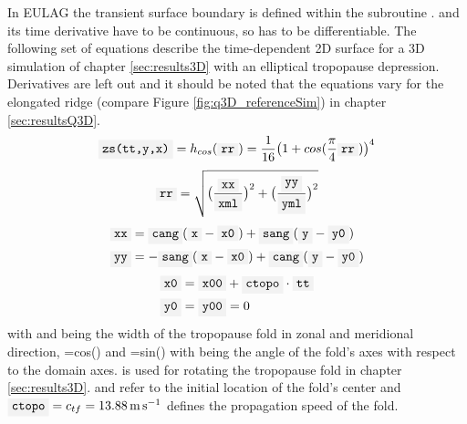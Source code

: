 In EULAG the transient surface boundary  is defined within the subroutine .  and its time derivative  have to be continuous, so  has to be differentiable. The following set of equations describe the time-dependent 2D surface  for a 3D simulation of chapter \ref{sec:results3D} with an elliptical tropopause depression. Derivatives are left out and it should be noted that the equations vary for the elongated ridge (compare Figure \ref{fig:q3D_referenceSim}) in chapter \ref{sec:resultsQ3D}.
\begin{equation}
    \code{zs(tt,y,x)} = h_{cos}(\code{rr}) =\frac{1}{16} \bigl(1+cos(\frac{\pi}{4} \code{rr})\bigr)^4
    \label{equ:cosMtn-1}
\end{equation}
\begin{equation}
    \code{rr} = \sqrt{\bigl(\frac{\code{xx}}{\code{xml}}\bigr)^2 + \bigl(\frac{\code{yy}}{\code{yml}}\bigr)^2}
    \label{equ:cosMtn-2}
\end{equation}
\begin{equation}
    \begin{aligned}
        \code{xx} &= \code{cang}(\code{x}-\code{x0}) + \code{sang}(\code{y}-\code{y0}) \\
        \code{yy} &=-\code{sang}(\code{x}-\code{x0}) + \code{cang}(\code{y}-\code{y0}) 
    \end{aligned}
    \label{equ:cosMtn-3}
\end{equation}
\begin{equation}
    \begin{aligned}
    \code{x0} &= \code{x00} + \code{ctopo} \cdot \code{tt} \\ 
    \code{y0} &= \code{y00} = 0
    \label{equ:cosMtn-4}
    \end{aligned}
\end{equation}
with  and  being the width of the tropopause fold in zonal and meridional direction, =cos() and =sin() with  being the angle of the fold's axes with respect to the domain axes.  is used for rotating the tropopause fold in chapter \ref{sec:results3D}.  and  refer to the initial location of the fold's center and $\code{ctopo}=c_{tf}=\SI{13.88}{\meter \per \second}$ defines the propagation speed of the fold.

